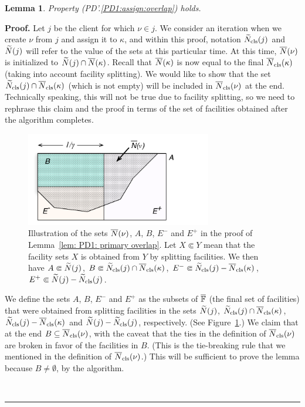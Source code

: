 \documentclass[oneside,final]{ucr}
\newtheorem{lemma}[theorem]{Lemma}
\newenvironment{proof}[1][Proof]{\textbf{#1.} }{\ \rule{0.5em}{0.5em}}
\begin{document}

\begin{lemma} \label{lem: PD1: primary overlap}
  Property (PD'.\ref{PD1:assign:overlap}) holds.
\end{lemma}

\begin{proof}
  Let $j$ be the client for which $\nu\in j$. We consider an iteration
  when we create $\nu$ from $j$ and assign it to $\kappa$, and
  within this proof, notation ${\widetilde N}_{{\mbox{\scriptsize\rm cls}}}(j)$ and ${\widetilde N}(j)$
  will refer to the value of the sets at this particular time.  
At this time, ${\overline{N}}(\nu)$ is initialized to ${\widetilde N}(j)\cap
  {\overline{N}}(\kappa)$.  Recall that ${\overline{N}}(\kappa)$ is now equal to the
  final ${\overline{N}}_{{\mbox{\scriptsize\rm cls}}}(\kappa)$ (taking into account facility splitting). We
  would like to show that the set ${\widetilde N}_{{\mbox{\scriptsize\rm cls}}}(j)\cap
  {\overline{N}}_{{\mbox{\scriptsize\rm cls}}}(\kappa)$ (which is not empty) will be included in
  ${\overline{N}}_{{\mbox{\scriptsize\rm cls}}}(\nu)$ at the end. Technically speaking, this will not be
  true due to facility splitting, so we need to rephrase this claim
  and the proof in terms of the set of facilities obtained after the
  algorithm completes.

\begin{figure}[ht]
\begin{center}
\includegraphics[width=3.2in]{proof_of_lemma_PD'3a.pdf}
\caption{Illustration of the sets ${\overline{N}}(\nu)$, $A$, $B$,
  $E^-$ and $E^+$ in the proof of Lemma~\ref{lem: PD1:
    primary overlap}. Let $X \Subset Y$ mean that the facility
	sets $X$ is obtained from $Y$ by splitting facilities.
	We then have $A \Subset {\widetilde N}(j)$, 
	$B \Subset  {\widetilde N}_{{\mbox{\scriptsize\rm cls}}}(j) \cap {\overline{N}}_{{\mbox{\scriptsize\rm cls}}}(\kappa)$, 
	$E^- \Subset  {\widetilde N}_{{\mbox{\scriptsize\rm cls}}}(j) - {\overline{N}}_{{\mbox{\scriptsize\rm cls}}}(\kappa)$, 
	$E^+ \Subset {\widetilde N}(j) - {\widetilde N}_{{\mbox{\scriptsize\rm cls}}}(j)$.}
\label{fig: sets lemma PD'3a}
\end{center}
\end{figure}

  We define the sets $A$, $B$, $E^-$ and $E^+$ as the subsets of
  $\overline{\mathbb{F}}$ (the final set of facilities) that were obtained from
  splitting facilities in the sets ${\widetilde N}(j)$, ${\widetilde N}_{{\mbox{\scriptsize\rm cls}}}(j)\cap
  {\overline{N}}_{{\mbox{\scriptsize\rm cls}}}(\kappa)$, ${\widetilde N}_{{\mbox{\scriptsize\rm cls}}}(j) - {\overline{N}}_{{\mbox{\scriptsize\rm cls}}}(\kappa)$ and
  ${\widetilde N}(j) - {\widetilde N}_{{\mbox{\scriptsize\rm cls}}}(j)$, respectively.  (See
  Figure~\ref{fig: sets lemma PD'3a}.)  We claim that at the end
  $B\subseteq {\overline{N}}_{{\mbox{\scriptsize\rm cls}}}(\nu)$, with the caveat that the ties in the
  definition of ${\overline{N}}_{{\mbox{\scriptsize\rm cls}}}(\nu)$ are broken in favor of the
  facilities in $B$.  (This is the tie-breaking rule that we mentioned
  in the definition of ${\overline{N}}_{{\mbox{\scriptsize\rm cls}}}(\nu)$.)  This will be sufficient to
  prove the lemma because $B\neq\emptyset$, by the algorithm.


\end{proof}
\end{document}
